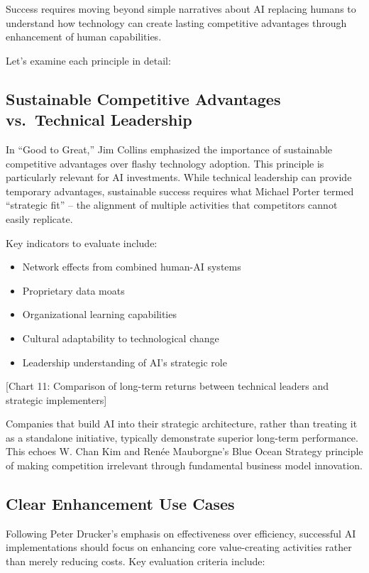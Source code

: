 \documentclass[
  Letterpaper,
]{scrbook}
\providecommand{\tightlist}{%
  \setlength{\itemsep}{0pt}\setlength{\parskip}{0pt}}\usepackage{longtable,booktabs,array}
\begin{document}
Success requires moving beyond simple narratives about AI replacing
humans to understand how technology can create lasting competitive
advantages through enhancement of human capabilities.

Let's examine each principle in detail:

\subsection{Sustainable Competitive Advantages vs.~Technical
Leadership}\label{sustainable-competitive-advantages-vs.-technical-leadership}

In ``Good to Great,'' Jim Collins emphasized the importance of
sustainable competitive advantages over flashy technology adoption. This
principle is particularly relevant for AI investments. While technical
leadership can provide temporary advantages, sustainable success
requires what Michael Porter termed ``strategic fit'' -- the alignment
of multiple activities that competitors cannot easily replicate.

Key indicators to evaluate include:

\begin{itemize}
\tightlist
\item
  Network effects from combined human-AI systems
\item
  Proprietary data moats
\item
  Organizational learning capabilities
\item
  Cultural adaptability to technological change
\item
  Leadership understanding of AI's strategic role
\end{itemize}

{[}Chart 11: Comparison of long-term returns between technical leaders
and strategic implementers{]}

Companies that build AI into their strategic architecture, rather than
treating it as a standalone initiative, typically demonstrate superior
long-term performance. This echoes W. Chan Kim and Renée Mauborgne's
Blue Ocean Strategy principle of making competition irrelevant through
fundamental business model innovation.

\subsection{Clear Enhancement Use
Cases}\label{clear-enhancement-use-cases}

Following Peter Drucker's emphasis on effectiveness over efficiency,
successful AI implementations should focus on enhancing core
value-creating activities rather than merely reducing costs. Key
evaluation criteria include:
\end{document}

